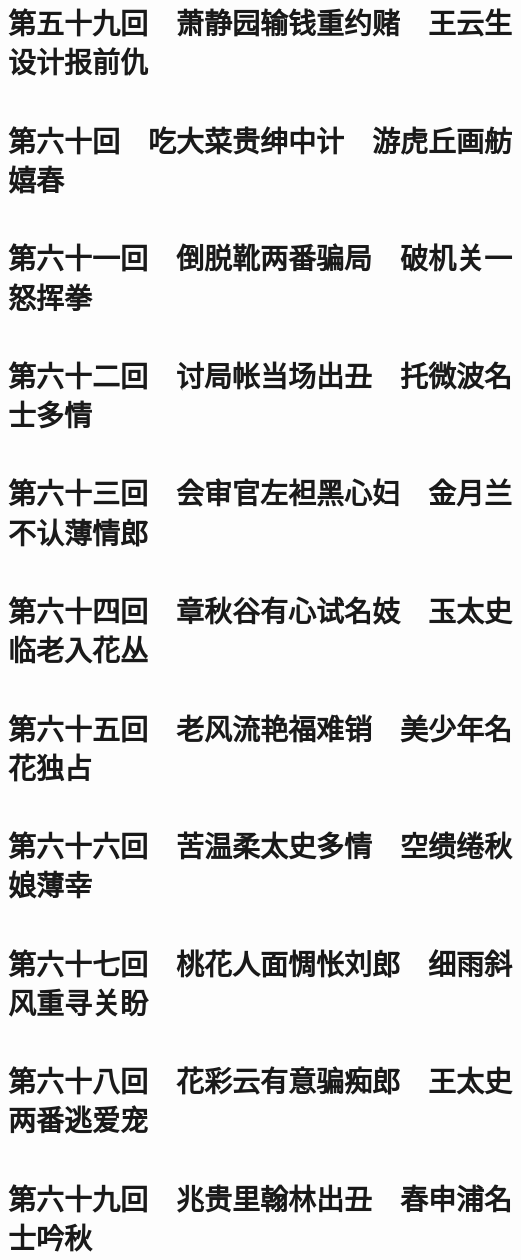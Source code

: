 \documentclass[12pt,UTF8]{ctexbook}
\begin{document}
\chapter{第五十九回　萧静园输钱重约赌　王云生设计报前仇}

\chapter{第六十回　吃大菜贵绅中计　游虎丘画舫嬉春}

\chapter{第六十一回　倒脱靴两番骗局　破机关一怒挥拳}

\chapter{第六十二回　讨局帐当场出丑　托微波名士多情}

\chapter{第六十三回　会审官左袒黑心妇　金月兰不认薄情郎}

\chapter{第六十四回　章秋谷有心试名妓　玉太史临老入花丛}

\chapter{第六十五回　老风流艳福难销　美少年名花独占}

\chapter{第六十六回　苦温柔太史多情　空缋绻秋娘薄幸}

\chapter{第六十七回　桃花人面惆怅刘郎　细雨斜风重寻关盼}

\chapter{第六十八回　花彩云有意骗痴郎　王太史两番逃爱宠}

\chapter{第六十九回　兆贵里翰林出丑　春申浦名士吟秋}
\end{document}
